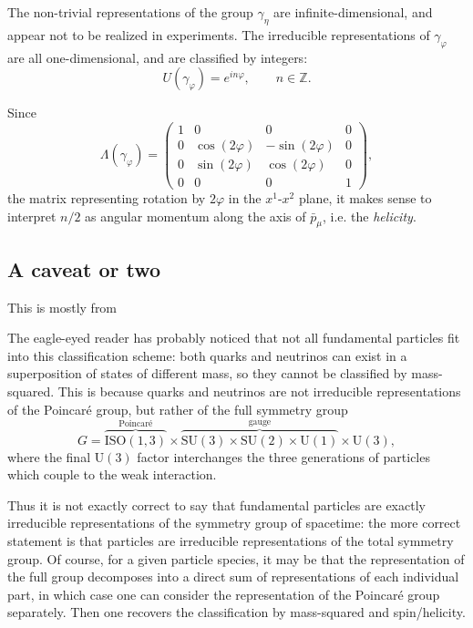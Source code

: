 \documentclass[a4paper,10pt]{scrreprt}
\newcommand{\Z}{\mathbb{Z}}
\theoremstyle{definition}
\theoremstyle{plain}
\theoremstyle{remark}
\begin{document}
The non-trivial representations of the group $\gamma_{\eta}$ are infinite-dimensional, and appear not to be realized in experiments. The irreducible representations of $\gamma_{\varphi}$ are all one-dimensional, and are classified by integers:
\begin{equation*}
  U(\gamma_{\varphi}) = e^{i n \varphi},\qquad n \in \Z.
\end{equation*}

Since
\begin{equation*}
  \Lambda(\gamma_{\varphi}) = 
  \begin{pmatrix}
    1 & 0 & 0 & 0 \\
    0 & \cos(2\varphi) & -\sin(2\varphi) & 0 \\
    0 & \sin(2\varphi) & \cos(2\varphi) & 0 \\
    0 & 0 & 0 & 1
  \end{pmatrix},
\end{equation*}
the matrix representing rotation by $2\varphi$ in the $x^{1}$-$x^{2}$ plane, it makes sense to interpret $n/2$ as angular momentum along the axis of $\bar{p}_{\mu}$, i.e. the \emph{helicity}.


\subsection{A caveat or two}
This is mostly from \cite{neumaier}

The eagle-eyed reader has probably noticed that not all fundamental particles fit into this classification scheme: both quarks and neutrinos can exist in a superposition of states of different mass, so they cannot be classified by mass-squared. This is because quarks and neutrinos are not irreducible representations of the Poincar\'{e} group, but rather of the full symmetry group
\begin{equation*}
  G = \overbrace{\mathrm{ISO}(1, 3)}^{\text{Poincar\'{e}}} \times \overbrace{\mathrm{SU}(3) \times \mathrm{SU}(2) \times \mathrm{U}(1)}^{\text{gauge}} \times \mathrm{U}(3),
\end{equation*}
where the final $\mathrm{U}(3)$ factor interchanges the three generations of particles which couple to the weak interaction.

Thus it is not exactly correct to say that fundamental particles are exactly irreducible representations of the symmetry group of spacetime: the more correct statement is that particles are irreducible representations of the total symmetry group. Of course, for a given particle species, it may be that the representation of the full group decomposes into a direct sum of representations of each individual part, in which case one can consider the representation of the Poincar\'{e} group separately. Then one recovers the classification by mass-squared and spin/helicity.
\end{document}
